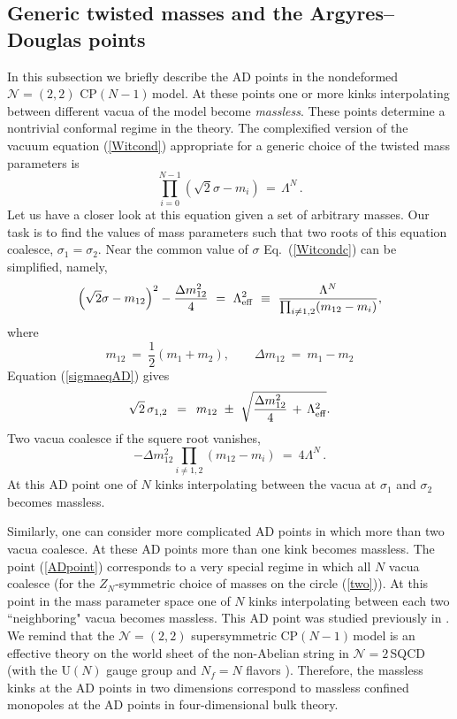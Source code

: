 \documentclass[epsfig,12pt]{article}
\def\beq{\begin{equation}}
\def\eeq{\end{equation}}
\newcommand{\ntwo}{${\mathcal N}=2\,$}
\newcommand{\cpn}{CP$(N-1)\,$}
\newcommand{\zn}{$Z_N$}
\def\beq{\begin{equation}}
\def\eeq{\end{equation}}
\newcommand{\ntwot}{${\mathcal N}= \left(2,2\right) $ }
\begin{document}
{\subsection{Generic twisted masses and  the Argyres--Douglas points}
\label{genadp}

In this subsection we briefly describe the AD points in the nondeformed \ntwot \cpn model.
At these points one or more kinks interpolating between different vacua of the model become
{\em massless}. These points determine a nontrivial conformal regime in the
theory. The complexified version of the vacuum equation (\ref{Witcond}) 
appropriate for a generic choice of the twisted mass parameters is
\beq
\prod_{i=0}^{N-1}\left(\sqrt{2}\sigma-m_i\right) \,=\,\Lambda^N \,.
\label{Witcondc}
\eeq
Let us have a closer look at this equation given a set of arbitrary masses.
Our task is to find  the values of mass parameters such that
two roots of this equation coalesce, $\sigma_1=\sigma_2$.  Near the common value of
$\sigma$ Eq.~(\ref{Witcondc}) can be simplified, namely,
\beq
\left(\sqrt{2}\sigma-m_{12}\right)^2-\frac{\Delta m^2_{12}}{4} ~=~ \Lambda_{\rm eff}^2 ~\equiv~ 
\frac{\Lambda^N}{\prod_{i\neq 1,2}(m_{12}-m_i)},
\label{sigmaeqAD}
\eeq
where
\beq
m_{12}~=~\frac12(m_1+m_2),\qquad \Delta m_{12}~=~m_1-m_2
\label{m12}
\eeq
Equation (\ref{sigmaeqAD}) gives
\beq
\sqrt{2}\,\sigma_{1,2} \,~=~\, m_{12} ~\pm~ \sqrt{\frac{\Delta m^2_{12}}{4} \,+\, \Lambda_{\rm eff}^2}.
\eeq
Two vacua coalesce if the squere root vanishes,
\beq
-\Delta m^2_{12}\prod_{i\neq 1,2}(m_{12}-m_i) ~=~ 4\Lambda^N\,.
\label{AD}
\eeq
At this AD point one of $N$ kinks interpolating between the vacua at $\sigma_1$ and $\sigma_2$
becomes massless.

Similarly, one can consider more complicated AD points in which more than two vacua coalesce.
At these AD points more than one kink becomes massless. The point (\ref{ADpoint})
corresponds to a very special  regime in which  all $N$ vacua coalesce (for the \zn-symmetric choice of 
masses   on the circle (\ref{two})). At this point in the mass parameter space one of $N$ kinks interpolating between each two ``neighboring" vacua becomes massless. This AD point was
studied previously  in \cite{Tadpoint}. We remind that the \ntwot supersymmetric \cpn model
is an effective theory on the world sheet of the non-Abelian string in \ntwo SQCD
(with the U$(N)$ gauge group and $N_f=N$   flavors \cite{HT1,ABEKY,SYmon,HT2}).
Therefore, the massless kinks at the AD points in two dimensions correspond to massless confined monopoles
at the AD points in four-dimensional bulk theory.

}
\end{document}
